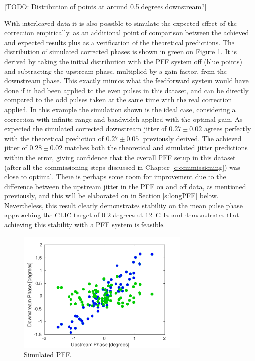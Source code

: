 [TODO: Distribution of points at around 0.5 degrees downstream?]


With interleaved data it is also possible to simulate the expected effect of the correction empirically, as an additional point of comparison between the achieved and expected results plus as a verification of the theoretical predictions. The distribution of simulated corrected phases is shown in green on Figure \ref{f:BestFF_Simulated}. It is derived by taking the initial distribution with the PFF system off (blue points) and subtracting the upstream phase, multiplied by a gain factor, from the downstream phase. This exactly mimics what the feedforward system would have done if it had been applied to the even pulses in this dataset, and can be directly compared to the odd pulses taken at the same time with the real correction applied. In this example the simulation shown is the ideal case, considering a correction with infinite range and bandwidth applied with the optimal gain. As expected the simulated corrected downstream jitter of \(0.27\pm0.02\) agrees perfectly with the theoretical prediction of \(0.27\pm0.05^\circ\) previously derived. The achieved jitter of \(0.28\pm0.02\) matches both the theoretical and simulated jitter predictions within the error, giving confidence that the overall PFF setup in this dataset (after all the commissioning steps discussed in Chapter \ref{c:commissioning}) was close to optimal. There is perhaps some room for improvement due to the difference between the upstream jitter in the PFF on and off data, as mentioned previously, and this will be elaborated on in Section \ref{s:longPFF} below. Nevertheless, this result clearly demonstrates stability on the mean pulse phase approaching the CLIC target of 0.2 degrees at 12~GHz and demonstrates that achieving this stability with a PFF system is feasible.


\begin{figure}
  \centering
  \includegraphics[width=0.75\textwidth]{Figures/feedforward/BestFF_Simulated}
  \caption{Simulated PFF.}
  \label{f:BestFF_Simulated}
\end{figure}


